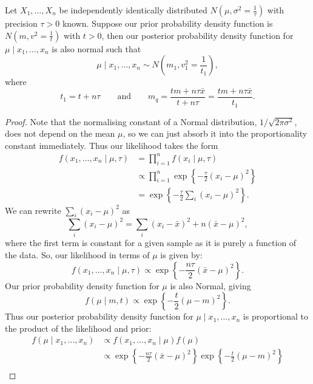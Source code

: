 \documentclass[10pt, a4paper]{article}
\begin{document}
\begin{theorem}
    Let $X_1, \dotsc, X_n$ be independently identically distributed $N\left(\mu, \sigma ^ 2 = \frac{1}{\tau}\right)$ with precision $\tau > 0$ known.
    Suppose our prior probability density function is $N\left(m, v ^ 2 = \frac{1}{t}\right)$ with $t > 0$,
    then our posterior probability density function for $\mu\mid x_1, \dotsc, x_n$ is also normal such that
    \[
    \mu\mid x_1, \dotsc, x_n \sim N\left(m_1, v_1 ^ 2 = \frac{1}{t_1}\right),
    \]
    where
    \[
    t_1 = t + n\tau\qquad\text{and}\qquad m_q = \frac{tm + n\tau\bar{x}}{t + n\tau} = \frac{tm + n\tau\bar{x}}{t_1}.
    \]

    \begin{proof}
        Note that the normalising constant of a Normal distribution,
        $1 / \sqrt{2\pi\sigma ^ 2}$,
        does not depend on the mean $\mu$,
        so we can just absorb it into the proportionality constant immediately.
        Thus our likelihood takes the form
        \begin{align*}
            f(x_1, \dotsc, x_n\mid\mu, \tau) &= \prod_{i = 1}^{n}f(x_i\mid \mu, \tau) \\
            &\propto \prod_{i = 1}^{n}\exp\left\{-\frac{\tau}{2}(x_i - \mu) ^ 2\right\} \\
            &= \exp\left\{-\frac{\tau}{2}\sum_{i}(x_i - \mu) ^ 2\right\}.
        \end{align*}
        We can rewrite $\sum_i(x_i - \mu) ^ 2$ as
        \[
        \sum_{i}(x_i - \mu) ^ 2 = \sum_i(x_i - \bar{x}) ^ 2 + n(\bar{x} -\mu) ^ 2,
        \]
        where the first term is constant for a given sample as it is purely a function of the data.
        So,
        our likelihood in terms of $\mu$ is given by:
        \[
        f(x_1, \dotsc, x_n\mid\mu, \tau) \propto \exp\left\{-\frac{n\tau}{2}(\bar{x} - \mu) ^ 2\right\}.
        \]
        Our prior probability density function for $\mu$ is also Normal,
        giving
        \[
        f(\mu\mid m, t) \propto \exp\left\{-\frac{t}{2}(\mu - m) ^ 2\right\}.
        \]
        Thus our posterior probability density function for $\mu\mid x_1, \dotsc, x_n$ is proportional to the product of the likelihood and prior:
        \begin{align*}
            f(\mu\mid x_1, \dotsc, x_n) &\propto f(x_1, \dotsc, x_n\mid \mu)f(\mu) \\
            &\propto \exp\left\{-\frac{n\tau}{2}(\bar{x} - \mu) ^ 2\right\}\exp\left\{-\frac{t}{2}(\mu - m) ^ 2\right\} \\

\end{align*}
\end{proof}
\end{theorem}
\end{document}

